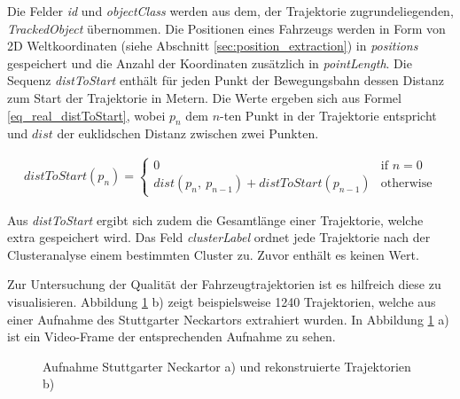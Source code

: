 Die Felder \textit{id} und \textit{objectClass} werden aus dem, der Trajektorie zugrundeliegenden, \textit{TrackedObject}
übernommen.
Die Positionen eines Fahrzeugs werden in Form von 2D Weltkoordinaten (siehe Abschnitt \ref{sec:position_extraction})
in \textit{positions} gespeichert und die Anzahl der Koordinaten zusätzlich in \textit{pointLength}.
Die Sequenz \textit{distToStart} enthält für jeden Punkt der Bewegungsbahn dessen Distanz zum Start der Trajektorie in Metern.
Die Werte ergeben sich aus Formel \ref{eq_real_distToStart}, wobei $p_n$ dem $n$-ten Punkt in der Trajektorie entspricht
und $dist$ der euklidschen Distanz zwischen zwei Punkten.

\begin{ceqn}
\begin{align}
\label{eq_real_distToStart}
    distToStart(p_n) =
    \begin{cases}
        0 & \text{if } n = 0 \\
        dist(p_n,\ p_{n-1}) + distToStart(p_{n-1}) & \text{otherwise}
    \end{cases}
\end{align}
\end{ceqn}

Aus \textit{distToStart} ergibt sich zudem die Gesamtlänge einer Trajektorie, welche extra gespeichert wird.
Das Feld \textit{clusterLabel} ordnet jede Trajektorie nach der Clusteranalyse einem bestimmten Cluster zu.
Zuvor enthält es keinen Wert.

Zur Untersuchung der Qualität der Fahrzeugtrajektorien ist es hilfreich diese zu visualisieren.
Abbildung \ref{fig:real_neckartor} b)
zeigt beispielsweise 1240 Trajektorien, welche aus einer Aufnahme des Stuttgarter Neckartors extrahiert wurden.
In Abbildung \ref{fig:real_neckartor} a) ist ein Video-Frame der entsprechenden Aufnahme zu sehen.

\begin{figure}[H]
    \centering
    \caption[Stuttgarter Neckartor und rekonstruierte Trajektorien]{Aufnahme Stuttgarter Neckartor a) und rekonstruierte Trajektorien b)}
    \label{fig:real_neckartor}
\end{figure}

